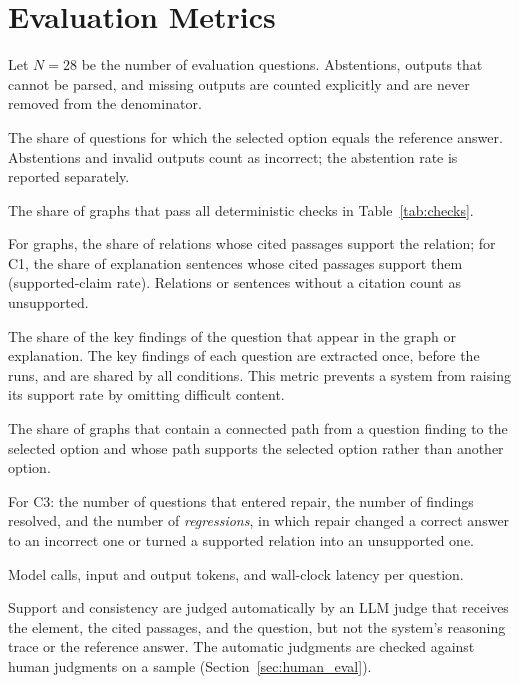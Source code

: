 \section{Evaluation Metrics}
\label{sec:metrics}

Let $N = 28$ be the number of evaluation questions. Abstentions, outputs that cannot be parsed, and missing outputs are counted explicitly and are never removed from the denominator.

\begin{description}[leftmargin=0.6cm, style=nextline]
  \item[Answer accuracy] The share of questions for which the selected option equals the reference answer. Abstentions and invalid outputs count as incorrect; the abstention rate is reported separately.
  \item[Structural validity] The share of graphs that pass all deterministic checks in Table~\ref{tab:checks}.
  \item[Supported-relation rate] For graphs, the share of relations whose cited passages support the relation; for C1, the share of explanation sentences whose cited passages support them (supported-claim rate). Relations or sentences without a citation count as unsupported.
  \item[Finding coverage] The share of the key findings of the question that appear in the graph or explanation. The key findings of each question are extracted once, before the runs, and are shared by all conditions. This metric prevents a system from raising its support rate by omitting difficult content.
  \item[Answer--graph consistency] The share of graphs that contain a connected path from a question finding to the selected option and whose path supports the selected option rather than another option.
  \item[Repair outcomes] For C3: the number of questions that entered repair, the number of findings resolved, and the number of \emph{regressions}, in which repair changed a correct answer to an incorrect one or turned a supported relation into an unsupported one.
  \item[Cost] Model calls, input and output tokens, and wall-clock latency per question.
\end{description}

Support and consistency are judged automatically by an LLM judge that receives the element, the cited passages, and the question, but not the system's reasoning trace or the reference answer.  The automatic judgments are checked against human judgments on a sample (Section~\ref{sec:human_eval}).

